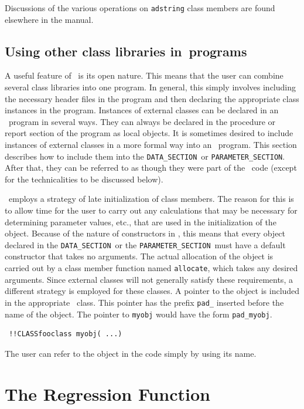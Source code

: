 \documentclass{admbmanual}
\newcommand\DS{\texttt{DATA\_SECTION}}
\newcommand\PS{\texttt{PARAMETER\_SECTION}}
\begin{document}
Discussions of the various
operations on \texttt{adstring} class members are found elsewhere in the
manual.


\section{Using other class libraries in\br \ADM\ programs}

A useful feature of \cplus\ is its open nature.  This means that the user
can combine several class libraries into one program. In general, this simply
involves including the necessary header files in the program and then
declaring the appropriate class instances in the program.
Instances of external classes can be declared in an \ADM\ program in several ways.
They can always be declared in the procedure or report section 
of the program as local objects. It is sometimes desired to include instances
of external classes in a more formal way into an \ADM\ program. 
This section describes how to include them into the \DS\ or \PS.
After that, they can be referred to as though they were part of the 
\ADM\ code (except for the technicalities to be discussed below).
 
\ADM\ employs a strategy of late initialization of class members. The reason for
this is to allow time for the user to carry out any calculations that
may be necessary for determining parameter values, etc., that are used
in the initialization of the object. Because of the nature of constructors in
\cplus, this means that every object declared in the \DS\ or the \PS\
must have a default constructor that takes no arguments. The actual
allocation of the object is carried out by a class member function 
named \texttt{allocate}, which takes any desired arguments.
Since external classes will not generally satisfy these requirements,
a different strategy is employed for these classes. 
A pointer to the object is included in the 
appropriate \ADM\ class. This pointer has the prefix \texttt{pad\_} inserted before
the name of the object. The pointer to \texttt{myobj} would have
the form \texttt{pad\_myobj}.
\begin{lstlisting}
 !!CLASSfooclass myobj( ...)
\end{lstlisting}
The user can refer to the object in the code simply by using its name.



\appendix


\chapter{The Regression Function}\label{ch:appendix-regression-function}
\end{document}
